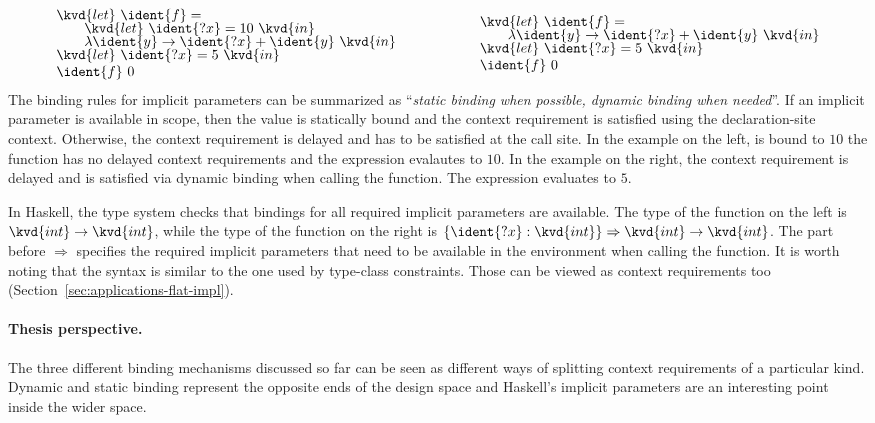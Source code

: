 \begin{equation*}
\begin{array}{l}
\kvd{let}~\ident{f}=\\[-0.25em]
\qquad\kvd{let}~\ident{?x}=10~\kvd{in}\\[-0.25em]
\qquad\lambda \ident{y}\rightarrow \ident{?x}+\ident{y}~\kvd{in}\\[-0.25em]
\kvd{let}~\ident{?x}=5~\kvd{in}\\
\ident{f}~0
\end{array}\hspace{5em}\begin{array}{l}
\kvd{let}~\ident{f}=\\[-0.25em]
\qquad\lambda \ident{y}\rightarrow \ident{?x}+\ident{y}~\kvd{in}\\[-0.25em]
\kvd{let}~\ident{?x}=5~\kvd{in}\\
\ident{f}~0
\end{array}
\end{equation*}
%
The binding rules for implicit parameters can be summarized as ``\emph{static binding when possible,
dynamic binding when needed}''. If an implicit parameter is available in scope, then the value
is statically bound and the context requirement is satisfied using the declaration-site context.
Otherwise, the context requirement is delayed and has to be satisfied at the call site.
In the example on the left,  is bound to $10$ the function  has no
delayed context requirements and the expression evalautes to $10$. In the example on the right,
the context requirement  is delayed and is satisfied via dynamic binding when calling
the function. The expression evaluates to $5$.

In Haskell, the type system checks that bindings for all required implicit parameters are
available. The type of the function  on the left is $\kvd{int}\rightarrow\kvd{int}$, while
the type of the  function on the right is $\{\ident{?x}:\kvd{int}\}\Rightarrow\kvd{int}\rightarrow\kvd{int}$.
The part before $\Rightarrow$ specifies the required implicit parameters that need to be available
in the environment when calling the function. It is worth noting that the syntax is similar to the
one used by type-class constraints. Those can be viewed as context requirements too
(Section~\ref{sec:applications-flat-impl}).

\paragraph{Thesis perspective.}
The three different binding mechanisms discussed so far can be seen as different ways of splitting
context requirements of a particular kind. Dynamic and static binding represent the opposite ends
of the design space and Haskell's implicit parameters are an interesting point inside the wider space.

